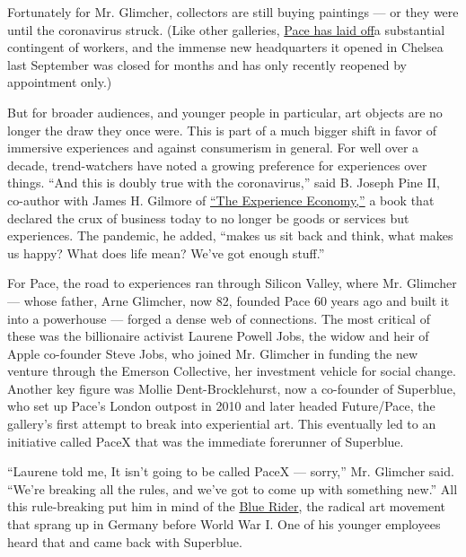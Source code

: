 Fortunately for Mr. Glimcher, collectors are still buying paintings ---
or they were until the coronavirus struck. (Like other galleries,
\href{https://www.artnews.com/art-news/news/pace-gallery-lay-offs-1202695286/}{Pace
has laid off}a substantial contingent of workers, and the immense new
headquarters it opened in Chelsea last September was closed for months
and has only recently reopened by appointment only.)

But for broader audiences, and younger people in particular, art objects
are no longer the draw they once were. This is part of a much bigger
shift in favor of immersive experiences and against consumerism in
general. For well over a decade, trend-watchers have noted a growing
preference for experiences over things. ``And this is doubly true with
the coronavirus,'' said B. Joseph Pine II, co-author with James H.
Gilmore of
\href{https://www.google.com/books/edition/The_Experience_Economy/5hs-tyRrSXMC?hl=en\&gbpv=0\&kptab=getbook}{``The
Experience Economy,''} a book that declared the crux of business today
to no longer be goods or services but experiences. The pandemic, he
added, ``makes us sit back and think, what makes us happy? What does
life mean? We've got enough stuff.''

For Pace, the road to experiences ran through Silicon Valley, where Mr.
Glimcher --- whose father, Arne Glimcher, now 82, founded Pace 60 years
ago and built it into a powerhouse --- forged a dense web of
connections. The most critical of these was the billionaire activist
Laurene Powell Jobs, the widow and heir of Apple co-founder Steve Jobs,
who joined Mr. Glimcher in funding the new venture through the Emerson
Collective, her investment vehicle for social change. Another key figure
was Mollie Dent-Brocklehurst, now a co-founder of Superblue, who set up
Pace's London outpost in 2010 and later headed Future/Pace, the
gallery's first attempt to break into experiential art. This eventually
led to an initiative called PaceX that was the immediate forerunner of
Superblue.

``Laurene told me, It isn't going to be called PaceX --- sorry,'' Mr.
Glimcher said. ``We're breaking all the rules, and we've got to come up
with something new.'' All this rule-breaking put him in mind of the
\href{https://www.nytimes3xbfgragh.onion/2018/10/24/arts/design/franz-marc-august-macke-neue-galerie.html}{Blue
Rider}, the radical art movement that sprang up in Germany before World
War I. One of his younger employees heard that and came back with
Superblue.

